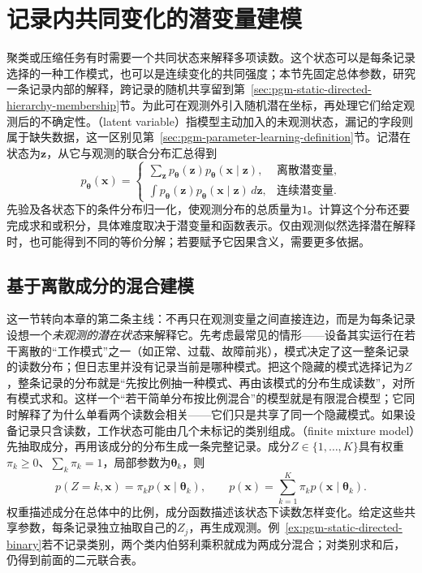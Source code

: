 \section{记录内共同变化的潜变量建模}
\label{sec:pgm-static-directed-latent}

聚类或压缩任务有时需要一个共同状态来解释多项读数。这个状态可以是每条记录选择的一种工作模式，也可以是连续变化的共同强度；本节先固定总体参数，研究一条记录内部的解释，跨记录的随机共享留到第~\ref{sec:pgm-static-directed-hierarchy-membership}节。为此可在观测外引入随机潜在坐标，再处理它们给定观测后的不确定性。（latent variable）指模型主动加入的未观测状态，漏记的字段则属于缺失数据，这一区别见第~\ref{sec:pgm-parameter-learning-definition}节。记潜在状态为$\bm z$，从它与观测的联合分布汇总得到
\begin{equation}
  \label{eq:pgm-static-directed-marginal}
  p_{\bm{\theta}}(\bm{x})=
  \begin{cases}
    \sum_{\bm{z}}p_{\bm{\theta}}(\bm{z})
          p_{\bm{\theta}}(\bm{x}\mid\bm{z}),
          &\text{离散潜变量},\\
    \int p_{\bm{\theta}}(\bm{z})
          p_{\bm{\theta}}(\bm{x}\mid\bm{z})\,d\bm{z},
          &\text{连续潜变量}.
  \end{cases}
\end{equation}
先验及各状态下的条件分布归一化，使观测分布的总质量为$1$。计算这个分布还要完成求和或积分，具体难度取决于潜变量和函数表示。仅由观测似然选择潜在解释时，也可能得到不同的等价分解；若要赋予它因果含义，需要更多依据。

\subsection{基于离散成分的混合建模}
\label{sec:pgm-static-directed-mixtures}

这一节转向本章的第二条主线：不再只在观测变量之间直接连边，而是为每条记录设想一个\emph{未观测的潜在状态}来解释它。先考虑最常见的情形——设备其实运行在若干离散的“工作模式”之一（如正常、过载、故障前兆），模式决定了这一整条记录的读数分布；但日志里并没有记录当前是哪种模式。把这个隐藏的模式选择记为$Z$，整条记录的分布就是“先按比例抽一种模式、再由该模式的分布生成读数”，对所有模式求和。这样一个“若干简单分布按比例混合”的模型就是有限混合模型；它同时解释了为什么单看两个读数会相关——它们只是共享了同一个隐藏模式。如果设备记录只含读数，工作状态可能由几个未标记的类别组成。（finite mixture model）先抽取成分，再用该成分的分布生成一条完整记录。成分$Z\in\{1,\ldots,K\}$具有权重$\pi_k\ge0$、$\sum_k\pi_k=1$，局部参数为$\bm\theta_k$，则
\begin{equation}
  \label{eq:pgm-static-directed-mixture}
  p(Z=k,\bm{x})=\pi_k p(\bm{x}\mid\bm{\theta}_k),
  \qquad
  p(\bm{x})=\sum_{k=1}^{K}\pi_kp(\bm{x}\mid\bm{\theta}_k).
\end{equation}
权重描述成分在总体中的比例，成分函数描述该状态下读数怎样变化。给定这些共享参数，每条记录独立抽取自己的$Z_j$，再生成观测。例~\ref{ex:pgm-static-directed-binary}若不记录类别，两个类内伯努利乘积就成为两成分混合；对类别求和后，仍得到前面的二元联合表。

